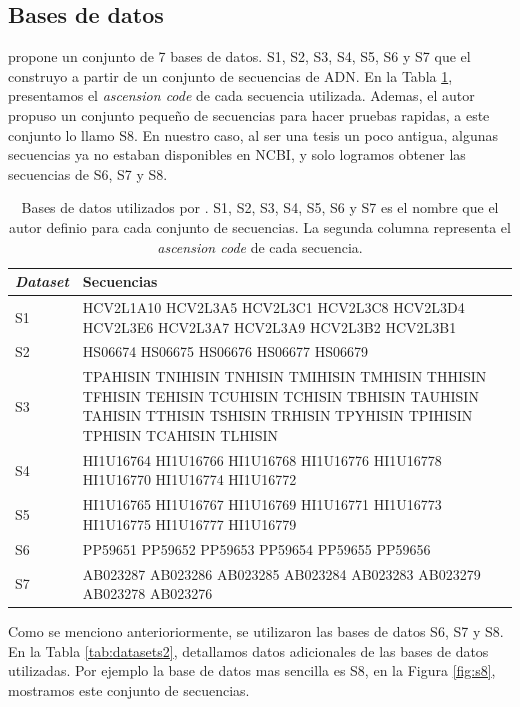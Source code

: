 \documentclass{cup-pan}
\begin{document}
	\subsection{Bases de datos}
	\citet{zablocki2009multiple} propone un conjunto de 7 bases de datos. S1, S2, S3, S4, S5, S6 y S7 que el construyo a partir de un conjunto de secuencias de ADN. En la Tabla \ref{tab:datasets}, presentamos el \textit{ascension code} de cada secuencia utilizada. Ademas, el autor propuso un conjunto pequeño de secuencias para hacer pruebas rapidas, a este conjunto lo llamo S8. En nuestro caso, al ser una tesis un poco antigua, algunas secuencias ya no estaban disponibles en NCBI, y solo logramos obtener las secuencias de S6, S7 y S8. \\
	
	\begin{table}[h]
		\caption{Bases de datos utilizados por \citet{zablocki2009multiple}. S1, S2, S3, S4, S5, S6 y S7 es el nombre que el autor definio para cada conjunto de secuencias. La segunda columna representa el \textit{ascension code} de cada secuencia.}
		\begin{tabular}{lp{12cm}}

			\textbf{\textit{Dataset}} & \textbf{Secuencias} \\
			\hline			
			S1	& HCV2L1A10 HCV2L3A5 HCV2L3C1 HCV2L3C8 HCV2L3D4 HCV2L3E6 HCV2L3A7 HCV2L3A9 HCV2L3B2  HCV2L3B1		\\				
			S2	& HS06674 HS06675 HS06676 HS06677 HS06679 \\
			S3  & TPAHISIN TNIHISIN TNHISIN TMIHISIN TMHISIN THHISIN TFHISIN TEHISIN TCUHISIN TCHISIN TBHISIN TAUHISIN TAHISIN TTHISIN TSHISIN TRHISIN TPYHISIN TPIHISIN TPHISIN TCAHISIN TLHISIN \\
			S4  & HI1U16764 HI1U16766 HI1U16768 HI1U16776 HI1U16778 HI1U16770	HI1U16774	HI1U16772 \\
			S5  & HI1U16765 HI1U16767 HI1U16769 HI1U16771 HI1U16773	HI1U16775 HI1U16777 HI1U16779 \\
			S6  & PP59651 PP59652 PP59653 PP59654 PP59655 PP59656 \\
			S7  & AB023287 AB023286 AB023285 AB023284 AB023283	AB023279 AB023278 AB023276 \\
			\hline 
		\end{tabular}		
		\label{tab:datasets}
	\end{table}

	Como se menciono anterioriormente, se utilizaron las bases de datos S6, S7 y S8. En la Tabla \ref{tab:datasets2}, detallamos datos adicionales de las bases de datos utilizadas. Por ejemplo la base de datos mas sencilla es S8, en la Figura \ref{fig:s8}, mostramos este conjunto de secuencias.
	
\end{document}
